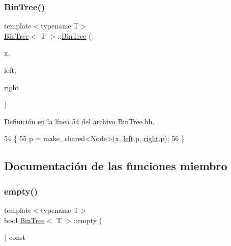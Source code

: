 \subsubsection{\texorpdfstring{Bin\+Tree()}{BinTree()}\hspace{0.1cm}{\footnotesize\ttfamily [3/3]}}
{\footnotesize\ttfamily template$<$typename T$>$ \\
\mbox{\hyperlink{class_bin_tree}{Bin\+Tree}}$<$ T $>$\+::\mbox{\hyperlink{class_bin_tree}{Bin\+Tree}} (\begin{DoxyParamCaption}\item[{const T \&}]{x,  }\item[{const \mbox{\hyperlink{class_bin_tree}{Bin\+Tree}}$<$ T $>$ \&}]{left,  }\item[{const \mbox{\hyperlink{class_bin_tree}{Bin\+Tree}}$<$ T $>$ \&}]{right }\end{DoxyParamCaption})\hspace{0.3cm}{\ttfamily [explicit]}}



Definición en la línea 54 del archivo Bin\+Tree.\+hh.


\begin{DoxyCode}
54                                                                              \{
55         p = make\_shared<Node>(x, \mbox{\hyperlink{class_bin_tree_a82108db4c1b08d1f111027788c196d4e}{left}}.p, \mbox{\hyperlink{class_bin_tree_aff8e96651b27284c329667b5ad3e4d0b}{right}}.p);
56     \}
\end{DoxyCode}


\subsection{Documentación de las funciones miembro}
\mbox{\label{class_bin_tree_a74cda259ba5c25b8ee38ed4dc33e4fad}} 
\subsubsection{\texorpdfstring{empty()}{empty()}}
{\footnotesize\ttfamily template$<$typename T$>$ \\
bool \mbox{\hyperlink{class_bin_tree}{Bin\+Tree}}$<$ T $>$\+::empty (\begin{DoxyParamCaption}{ }\end{DoxyParamCaption}) const}



